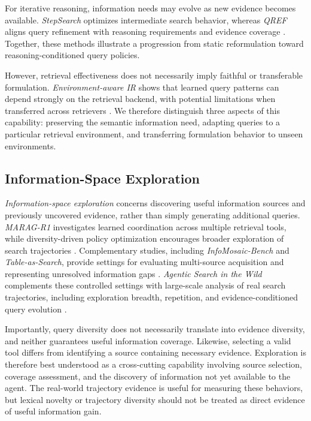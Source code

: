 For iterative reasoning, information needs may evolve as new evidence becomes available. \textit{StepSearch} optimizes intermediate search behavior, whereas \textit{QREF} aligns query refinement with reasoning requirements and evidence coverage \cite{stepsearch,qref}. Together, these methods illustrate a progression from static reformulation toward reasoning-conditioned query policies.

However, retrieval effectiveness does not necessarily imply faithful or transferable formulation. \textit{Environment-aware IR} shows that learned query patterns can depend strongly on the retrieval backend, with potential limitations when transferred across retrievers \cite{environment_aware_ir}. We therefore distinguish three aspects of this capability: preserving the semantic information need, adapting queries to a particular retrieval environment, and transferring formulation behavior to unseen environments.

\subsection{Information-Space Exploration}
\label{sec:information_space_exploration}

\textit{Information-space exploration} concerns discovering useful information sources and previously uncovered evidence, rather than simply generating additional queries. \textit{MARAG-R1} investigates learned coordination across multiple retrieval tools, while diversity-driven policy optimization encourages broader exploration of search trajectories \cite{marag_r1,ddpo_search}. Complementary studies, including \textit{InfoMosaic-Bench} and \textit{Table-as-Search}, provide settings for evaluating multi-source acquisition and representing unresolved information gaps \cite{infomosaic_bench,table_as_search}. \textit{Agentic Search in the Wild} complements these controlled settings with large-scale analysis of real search trajectories, including exploration breadth, repetition, and evidence-conditioned query evolution \cite{agentic_search_in_the_wild}.

Importantly, query diversity does not necessarily translate into evidence diversity, and neither guarantees useful information coverage. Likewise, selecting a valid tool differs from identifying a source containing necessary evidence. Exploration is therefore best understood as a cross-cutting capability involving source selection, coverage assessment, and the discovery of information not yet available to the agent. The real-world trajectory evidence is useful for measuring these behaviors, but lexical novelty or trajectory diversity should not be treated as direct evidence of useful information gain.

